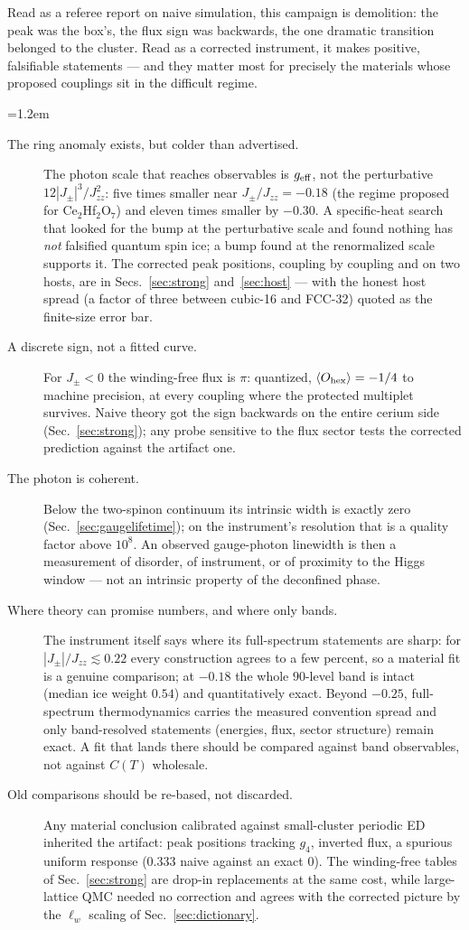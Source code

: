 \documentclass[11pt,a4paper]{article}
\newcommand{\Jpm}{J_{\pm}}
\newcommand{\Jzz}{J_{zz}}
\newcommand{\gfour}{g_4}
\newcommand{\Ohex}{O_{\rm hex}}
\begin{document}
Read as a referee report on naive simulation, this campaign is demolition:
the peak was the box's, the flux sign was backwards, the one dramatic
transition belonged to the cluster.  Read as a corrected instrument, it
makes positive, falsifiable statements --- and they matter most for
precisely the materials whose proposed couplings sit in the difficult
regime.

\begingroup
\emergencystretch=1.2em
\begin{description}
\item[The ring anomaly exists, but colder than advertised.]  The photon
scale that reaches observables is $g_{\rm eff}$, not the perturbative
$12|\Jpm|^3/\Jzz^2$: five times smaller near $\Jpm/\Jzz=-0.18$ (the
regime proposed for Ce$_2$Hf$_2$O$_7$) and eleven times smaller by
$-0.30$.  A specific-heat search that looked for the bump at the
perturbative scale and found nothing has \emph{not} falsified quantum spin
ice; a bump found at the renormalized scale supports it.  The corrected
peak positions, coupling by coupling and on two hosts, are in
Secs.~\ref{sec:strong} and~\ref{sec:host} --- with the honest host spread
(a factor of three between cubic-16 and FCC-32) quoted as the finite-size
error bar.
\item[A discrete sign, not a fitted curve.]  For $\Jpm<0$ the winding-free
flux is $\pi$: quantized, $\langle\Ohex\rangle=-1/4$ to machine precision,
at every coupling where the protected multiplet survives.  Naive theory got
the sign backwards on the entire cerium side (Sec.~\ref{sec:strong}); any
probe sensitive to the flux sector tests the corrected prediction against
the artifact one.
\item[The photon is coherent.]  Below the two-spinon continuum its
intrinsic width is exactly zero (Sec.~\ref{sec:gaugelifetime}); on the
instrument's resolution that is a quality factor above $10^8$.  An observed
gauge-photon linewidth is then a measurement of disorder, of instrument, or
of proximity to the Higgs window --- not an intrinsic property of the
deconfined phase.
\item[Where theory can promise numbers, and where only bands.]  The
instrument itself says where its full-spectrum statements are sharp: for
$|\Jpm|/\Jzz\lesssim0.22$ every construction agrees to a few percent, so a
material fit is a genuine comparison; at $-0.18$ the whole $90$-level band
is intact (median ice weight $0.54$) and quantitatively exact.  Beyond
$-0.25$, full-spectrum thermodynamics carries the measured
convention spread and only band-resolved statements (energies, flux,
sector structure) remain exact.  A fit that lands there should be compared
against band observables, not against $C(T)$ wholesale.
\item[Old comparisons should be re-based, not discarded.]  Any material
conclusion calibrated against small-cluster periodic ED inherited the
artifact: peak positions tracking $\gfour$, inverted flux, a spurious
uniform response ($0.333$ naive against an exact $0$).  The winding-free
tables of Sec.~\ref{sec:strong} are drop-in replacements at the same cost,
while large-lattice QMC needed no correction and agrees with the corrected
picture by the $\ell_w$ scaling of Sec.~\ref{sec:dictionary}.
\end{description}
\end{document}
